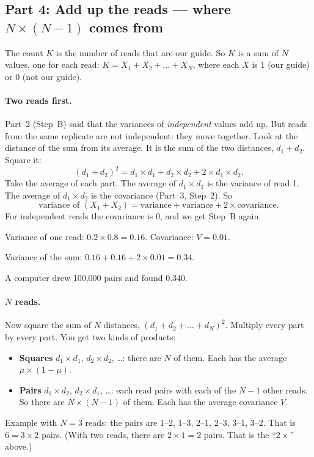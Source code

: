 \subsection{Part 4: Add up the reads --- where $N \times (N-1)$ comes from}

The count $K$ is the number of reads that are our guide. So $K$ is a sum of
$N$ values, one for each read: $K = X_1 + X_2 + \dots + X_N$, where each
$X$ is 1 (our guide) or 0 (not our guide).

\paragraph{Two reads first.} Part~2 (Step~B) said that the variances of
\emph{independent} values add up. But reads from the same replicate are not
independent: they move together. Look at the distance of the sum from its
average. It is the sum of the two distances, $d_1 + d_2$. Square it:
\[
(d_1 + d_2)^2 = d_1 \times d_1 + d_2 \times d_2 + 2 \times d_1 \times d_2 .
\]
Take the average of each part. The average of $d_1 \times d_1$ is the
variance of read 1. The average of $d_1 \times d_2$ is the covariance
(Part~3, Step~2). So
\[
\text{variance of } (X_1 + X_2) = \text{variance} + \text{variance} + 2 \times \text{covariance}.
\]
For independent reads the covariance is 0, and we get Step~B again.

\begin{worked}
Variance of one read: $0.2 \times 0.8 = 0.16$. Covariance: $V = 0.01$.

Variance of the sum: $0.16 + 0.16 + 2 \times 0.01 = 0.34$.

A computer drew 100{,}000 pairs and found 0.340.
\end{worked}

\paragraph{$N$ reads.} Now square the sum of $N$ distances,
$(d_1 + d_2 + \dots + d_N)^2$. Multiply every part by every part. You get
two kinds of products:
\begin{itemize}
\item \textbf{Squares} $d_1 \times d_1$, $d_2 \times d_2$, \dots: there are
  $N$ of them. Each has the average $\mu \times (1-\mu)$.
\item \textbf{Pairs} $d_1 \times d_2$, $d_2 \times d_1$, \dots: each read
  pairs with each of the $N-1$ other reads. So there are
  $N \times (N-1)$ of them. Each has the average covariance $V$.
\end{itemize}
Example with $N = 3$ reads: the pairs are 1--2, 1--3, 2--1, 2--3, 3--1,
3--2. That is $6 = 3 \times 2$ pairs. (With two reads, there are
$2 \times 1 = 2$ pairs. That is the ``$2 \times$'' above.)


